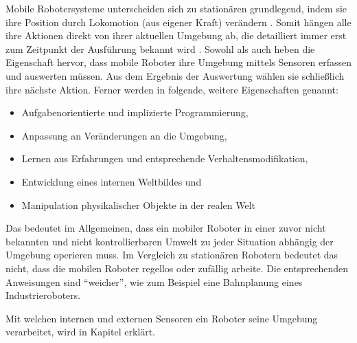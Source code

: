 Mobile Robotersysteme unterscheiden sich zu stationären grundlegend, indem sie ihre Position durch Lokomotion (aus eigener Kraft) verändern \cite{Haun2007}. Somit hängen alle ihre Aktionen direkt von ihrer aktuellen Umgebung ab, die detailliert immer erst zum Zeitpunkt der Ausführung bekannt wird \cite{hertzberg2009mobile}. Sowohl \cite{hertzberg2009mobile} als auch \cite{Haun2007} heben die Eigenschaft hervor, dass mobile Roboter ihre Umgebung mittels Sensoren erfassen und auswerten müssen. Aus dem Ergebnis der Auswertung wählen sie schließlich ihre nächste Aktion. Ferner werden in \cite{Haun2007} folgende, weitere Eigenschaften genannt:
\begin{itemize}
\item Aufgabenorientierte und implizierte Programmierung,
\item Anpassung an Veränderungen an die Umgebung,
\item Lernen aus Erfahrungen und entsprechende Verhaltensmodifikation,
\item Entwicklung eines internen Weltbildes und
\item Manipulation physikalischer Objekte in der realen Welt
\end{itemize}
Das bedeutet im Allgemeinen, dass ein mobiler Roboter in einer zuvor nicht bekannten und nicht kontrollierbaren Umwelt zu jeder Situation abhängig der Umgebung operieren muss. Im Vergleich zu stationären Robotern bedeutet das nicht, dass die mobilen Roboter regellos oder zufällig arbeite. Die entsprechenden Anweisungen sind "`weicher"', wie zum Beispiel eine Bahnplanung eines Industrieroboters.

Mit welchen internen und externen Sensoren ein Roboter seine Umgebung verarbeitet, wird in Kapitel  erklärt.


